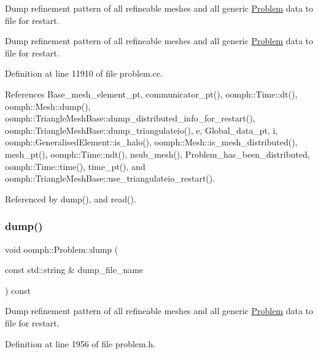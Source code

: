 Dump refinement pattern of all refineable meshes and all generic \hyperlink{classoomph_1_1Problem}{Problem} data to file for restart. 

Dump refinement pattern of all refineable meshes and all generic \hyperlink{classoomph_1_1Problem}{Problem} data to file for restart. 

Definition at line 11910 of file problem.\+cc.



References Base\+\_\+mesh\+\_\+element\+\_\+pt, communicator\+\_\+pt(), oomph\+::\+Time\+::dt(), oomph\+::\+Mesh\+::dump(), oomph\+::\+Triangle\+Mesh\+Base\+::dump\+\_\+distributed\+\_\+info\+\_\+for\+\_\+restart(), oomph\+::\+Triangle\+Mesh\+Base\+::dump\+\_\+triangulateio(), e, Global\+\_\+data\+\_\+pt, i, oomph\+::\+Generalised\+Element\+::is\+\_\+halo(), oomph\+::\+Mesh\+::is\+\_\+mesh\+\_\+distributed(), mesh\+\_\+pt(), oomph\+::\+Time\+::ndt(), nsub\+\_\+mesh(), Problem\+\_\+has\+\_\+been\+\_\+distributed, oomph\+::\+Time\+::time(), time\+\_\+pt(), and oomph\+::\+Triangle\+Mesh\+Base\+::use\+\_\+triangulateio\+\_\+restart().



Referenced by dump(), and read().

\mbox{\label{classoomph_1_1Problem_af94771cdd9de79c17c9cf168f4a67a92}} 
\subsubsection{\texorpdfstring{dump()}{dump()}\hspace{0.1cm}{\footnotesize\ttfamily [2/2]}}
{\footnotesize\ttfamily void oomph\+::\+Problem\+::dump (\begin{DoxyParamCaption}\item[{const std\+::string \&}]{dump\+\_\+file\+\_\+name }\end{DoxyParamCaption}) const\hspace{0.3cm}{\ttfamily [inline]}}



Dump refinement pattern of all refineable meshes and all generic \hyperlink{classoomph_1_1Problem}{Problem} data to file for restart. 



Definition at line 1956 of file problem.\+h.



